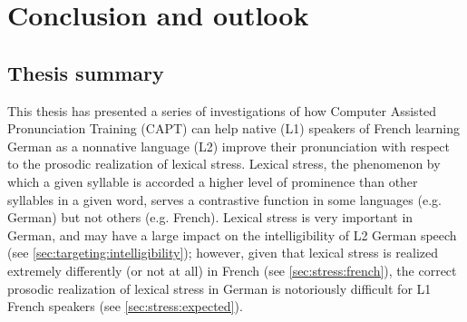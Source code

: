 %
%
\chapter{Conclusion and outlook}
\label{chap:conclusion}


\section{Thesis summary}
 \label{sec:conclusion:summary}
 
 This thesis has presented a series of investigations of how Computer Assisted Pronunciation Training (CAPT) can help native (L1) speakers of French learning German as a nonnative language (L2) improve their pronunciation with respect to the prosodic realization of lexical stress.
 Lexical stress, the phenomenon by which a given syllable is accorded a higher level of prominence than other syllables in a given word, serves a contrastive function in some languages (e.g. German) but not others (e.g. French).
 Lexical stress is very important in German, and may have a large impact on the intelligibility of L2 German speech (see \cref{sec:targeting:intelligibility}); however, given that lexical stress is realized extremely differently (or not at all) in French (see \cref{sec:stress:french}), the correct prosodic realization of lexical stress in German is notoriously difficult for L1 French speakers (see \cref{sec:stress:expected}). 
 
